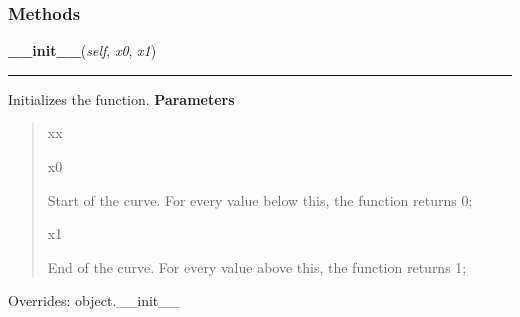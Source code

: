   \subsubsection{Methods}

    \vspace{0.5ex}

\hspace{.8\funcindent}\begin{boxedminipage}{\funcwidth}

    \raggedright \textbf{\_\_init\_\_}(\textit{self}, \textit{x0}, \textit{x1})

    \vspace{-1.5ex}

    \rule{\textwidth}{0.5\fboxrule}
\setlength{\parskip}{2ex}

Initializes the function.
\setlength{\parskip}{1ex}
      \textbf{Parameters}
      \vspace{-1ex}

      \begin{quote}
        \begin{Ventry}{xx}

          \item[x0]


Start of the curve. For every value below this, the function returns
0;
          \item[x1]


End of the curve. For every value above this, the function returns
1;
        \end{Ventry}

      \end{quote}

      Overrides: object.\_\_init\_\_

    \end{boxedminipage}

    \vspace{0.5ex}

